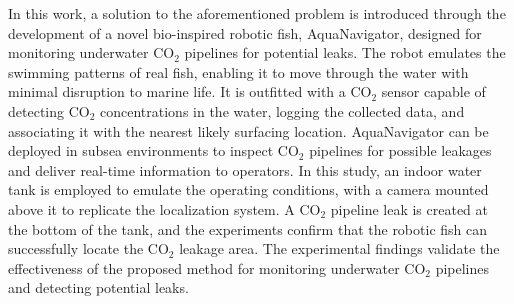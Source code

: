 \documentclass[12pt, draftclsnofoot, onecolumn]{IEEEtran}
\begin{document}
In this work, a solution to the aforementioned problem is introduced through the development of a novel bio-inspired robotic fish, AquaNavigator, designed for monitoring underwater CO$_2$ pipelines for potential leaks. The robot emulates the swimming patterns of real fish, enabling it to move through the water with minimal disruption to marine life. It is outfitted with a CO$_2$ sensor capable of detecting CO$_2$ concentrations in the water, logging the collected data, and associating it with the nearest likely surfacing location. AquaNavigator can be deployed in subsea environments to inspect CO$_2$ pipelines for possible leakages and deliver real-time information to operators. In this study, an indoor water tank is employed to emulate the operating conditions, with a camera mounted above it to replicate the localization system. A CO$_2$ pipeline leak is created at the bottom of the tank, and the experiments confirm that the robotic fish can successfully locate the CO$_2$ leakage area. The experimental findings validate the effectiveness of the proposed method for monitoring underwater CO$_2$ pipelines and detecting potential leaks.
\end{document}

